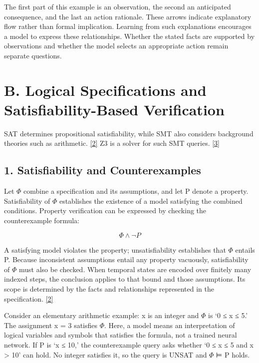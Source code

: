 \documentclass[11pt,a4paper]{article}
\begin{document}
The first part of this example is an observation, the second an anticipated consequence, and the last an action rationale. These arrows indicate explanatory flow rather than formal implication. Learning from such explanations encourages a model to express these relationships. Whether the stated facts are supported by observations and whether the model selects an appropriate action remain separate questions.\par

\section*{B. Logical Specifications and Satisfiability-Based Verification}

SAT determines propositional satisfiability, while SMT also considers background theories such as arithmetic. \href{\detokenize{https://theory.stanford.edu/~barrett/pubs/BT18.pdf}}{[2]} Z3 is a solver for such SMT queries. \href{\detokenize{https://doi.org/10.1007/978-3-540-78800-3_24}}{[3]}\par

\subsection*{1. Satisfiability and Counterexamples}

Let \ensuremath{\Phi} combine a specification and its assumptions, and let P denote a property. Satisfiability of \ensuremath{\Phi} establishes the existence of a model satisfying the combined conditions. Property verification can be expressed by checking the counterexample formula:\par

\[\Phi \land \neg P\]

A satisfying model violates the property; unsatisfiability establishes that \ensuremath{\Phi} entails P. Because inconsistent assumptions entail any property vacuously, satisfiability of \ensuremath{\Phi} must also be checked. When temporal states are encoded over finitely many indexed steps, the conclusion applies to that bound and those assumptions. Its scope is determined by the facts and relationships represented in the specification. \href{\detokenize{https://theory.stanford.edu/~barrett/pubs/BT18.pdf}}{[2]}\par

Consider an elementary arithmetic example: x is an integer and \ensuremath{\Phi} is ‘0 ≤ x ≤ 5.’ The assignment x = 3 satisfies \ensuremath{\Phi}. Here, a model means an interpretation of logical variables and symbols that satisfies the formula, not a trained neural network. If P is ‘x ≤ 10,’ the counterexample query asks whether ‘0 ≤ x ≤ 5 and x > 10’ can hold. No integer satisfies it, so the query is UNSAT and \ensuremath{\Phi} ⊨ P holds.\par
\end{document}
